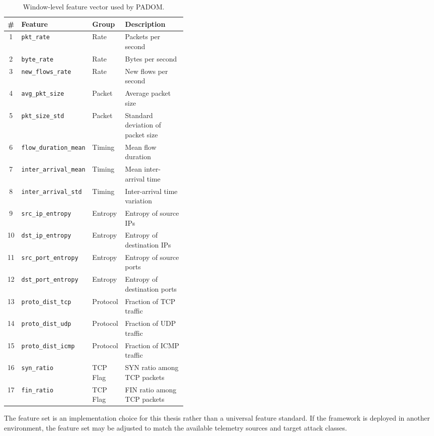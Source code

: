 \documentclass[12pt, a4paper, reqno, oneside]{book}
\newcommand{\padonap}{\textsc{PADOM}}
\begin{document}
\begin{table}[htbp]
\centering
\small
\caption{Window-level feature vector used by \padonap{}.}
\label{tab:features}
\begin{tabular}{@{}cllp{0.42\linewidth}@{}}
\toprule
\# & Feature & Group & Description \\
\midrule
1  & \texttt{pkt\_rate}          & Rate     & Packets per second \\
2  & \texttt{byte\_rate}         & Rate     & Bytes per second \\
3  & \texttt{new\_flows\_rate}   & Rate     & New flows per second \\
4  & \texttt{avg\_pkt\_size}     & Packet   & Average packet size \\
5  & \texttt{pkt\_size\_std}     & Packet   & Standard deviation of packet size \\
6  & \texttt{flow\_duration\_mean} & Timing  & Mean flow duration \\
7  & \texttt{inter\_arrival\_mean} & Timing  & Mean inter-arrival time \\
8  & \texttt{inter\_arrival\_std}  & Timing  & Inter-arrival time variation \\
9  & \texttt{src\_ip\_entropy}   & Entropy  & Entropy of source IPs \\
10 & \texttt{dst\_ip\_entropy}   & Entropy  & Entropy of destination IPs \\
11 & \texttt{src\_port\_entropy} & Entropy  & Entropy of source ports \\
12 & \texttt{dst\_port\_entropy} & Entropy  & Entropy of destination ports \\
13 & \texttt{proto\_dist\_tcp}   & Protocol & Fraction of TCP traffic \\
14 & \texttt{proto\_dist\_udp}   & Protocol & Fraction of UDP traffic \\
15 & \texttt{proto\_dist\_icmp}  & Protocol & Fraction of ICMP traffic \\
16 & \texttt{syn\_ratio}         & TCP Flag & SYN ratio among TCP packets \\
17 & \texttt{fin\_ratio}         & TCP Flag & FIN ratio among TCP packets \\
\bottomrule
\end{tabular}
\end{table}

The feature set is an implementation choice for this thesis rather than a
universal feature standard. If the framework is deployed in another
environment, the feature set may be adjusted to match the available telemetry
sources and target attack classes.
\end{document}
